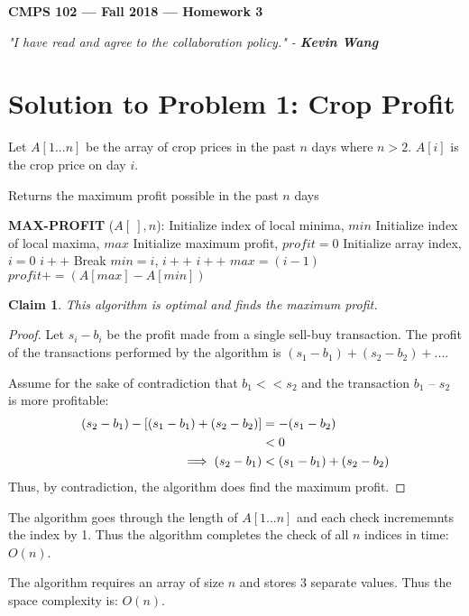 \documentclass[11pt]{article}
\theoremstyle{definition}
\theoremstyle{plain}
\newtheorem{claim}{Claim}
\theoremstyle{indented-remark}
\theoremstyle{indented-proof}
\begin{document}
\begin{center}
{\bf\Large CMPS 102 --- Fall 2018 ---  Homework 3}
\end{center}

\begin{center}
\textit{"I have read and agree to the collaboration policy." - \textbf{Kevin Wang}}
\end{center}

\section*{Solution to Problem 1: Crop Profit}

Let $A[1...n]$ be the array of crop prices in the past $n$ days where $n>2$. $A[i]$ is the crop price on day $i$.

\begin{algorithm}
\caption{Returns the maximum profit possible in the past $n$ days}
\begin{algorithmic} 
\STATE \textbf{MAX-PROFIT} ($A[\ ], n$):
\STATE Initialize index of local minima, $min$
\STATE Initialize index of local maxima, $max$
\STATE Initialize maximum profit, $profit=0$
\STATE Initialize array index, $i=0$
\STATE $i++$
\ENDWHILE
{}
\STATE Break
\ENDIF
\STATE $min=i$, $i++$
\STATE $i++$
\ENDWHILE
\STATE $max=(i-1)$
\STATE $profit += (A[max] - A[min])$
\ENDWHILE
\end{algorithmic}
\end{algorithm}

\begin{claim}
This algorithm is optimal and finds the maximum profit.
\end{claim}

\begin{proof}
Let $s_{i}-b_{i}$ be the profit made from a single sell-buy transaction. The profit of the transactions performed by the algorithm is $(s_{1}-b_{1})+(s_{2}-b_{2})+...$. \newline

\noindent Assume for the sake of contradiction that $b_{1} << s_{2}$ and the transaction $b_{1}$ -- $s_{2}$ is more profitable: \newline
\begin{align}
(s_{2}-b_{1}) - [(s_{1}-b_{1})+(s_{2}-b_{2})] &= -(s_{1}-b_{2})\notag \\
&< 0\notag \\
\implies (s_{2}-b_{1}) &< (s_{1}-b_{1})+(s_{2}-b_{2})\notag
\end{align}
Thus, by contradiction, the algorithm does find the maximum profit.
\end{proof}

\noindent The algorithm goes through the length of $A[1...n]$ and each check incrememnts the index by 1. Thus the algorithm completes the check of all $n$ indices in time: $O(n)$.\newline

\noindent The algorithm requires an array of size $n$ and stores 3 separate values. Thus the space complexity is: $O(n)$.
\end{document}
